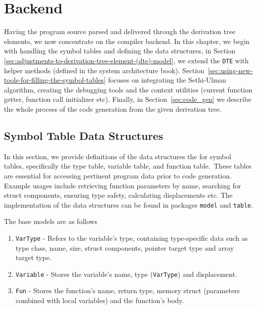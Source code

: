 \chapter{Backend}\label{ch:backend}
Having the program source parsed and delivered through the derivation tree elements, we now
concentrate on the compiler backend.
In this chapter, we begin with handling the symbol tables and defining the data structures, in Section
\ref{sec:adjustments-to-derivation-tree-element-(dte)-model}, we extend the \verb+DTE+
with helper methods (defined in the system architecture book).
Section~\ref{sec:using-new-tools-for-filling-the-symbol-tables} focuses on integrating the Sethi-Ulman algorithm,
creating the debugging tools and the context utilities (current function getter, function call initializer etc).
Finally, in Section~\ref{sec:code_gen} we describe the whole process of the code generation from the given derivation tree.


\section{Symbol Table Data Structures}\label{sec:symbol_table_models}
In this section, we provide definitions of the data structures the for symbol tables, specifically the type table, variable table, and function table.\
These tables are essential for accessing pertinent program data prior to code generation.
Example usages include retrieving function parameters by name, searching for struct components, ensuring type safety, calculating displacements etc.
The implementation of the data structures can be found in packages \verb+model+ and \verb+table+.

The base models are as follows
\begin{enumerate}
    \item \verb+VarType+ - Refers to the variable's type, containing type-specific data such as type class, name,
    size, struct components, pointer target type and array target type.
    \item \verb+Variable+ - Stores the variable's name, type (\verb+VarType+) and displacement.
    \item \verb+Fun+ - Stores the function's name, return type, memory struct (parameters combined with local variables) and the function's body.
\end{enumerate}

